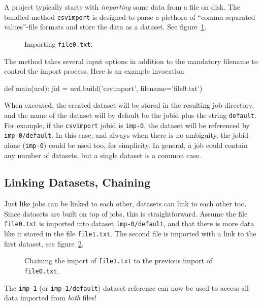 A project typically starts with \textsl{importing} some data from a
file on disk.  The bundled method \texttt{csvimport} is designed to
parse a plethora of ``comma separated values''-file formats and store
the data as a dataset.  See figure~\ref{fig:dataset_csvimport}.
\begin{figure}[b]
  \begin{center}
    
    \caption{Importing \texttt{file0.txt}.}
    \label{fig:dataset_csvimport}
  \end{center}
\end{figure}
The method takes several input options in addition to the mandatory
filename to control the import process.  Here is an example
invocation
\begin{python}
def main(urd):
    jid = urd.build('csvimport', filename='file0.txt')
\end{python}
When executed, the created dataset will be stored in the resulting job
directory, and the name of the dataset will by default be the jobid
plus the string \texttt{default}.  For example, if the
\texttt{csvimport} jobid is \texttt{imp-0}, the dataset will be
referenced by \texttt{imp-0/default}.  In this case, and always when
there is no ambiguity, the jobid alone (\texttt{imp-0}) could be used
too, for simplicity.  In general, a job could contain any number of
datasets, but a single dataset is a common case.




\subsection{Linking Datasets, Chaining}

Just like jobs can be linked to each other, datasets can link to each
other too.  Since datasets are built on top of jobs, this is
straightforward.  Assume the file \texttt{file0.txt} is imported into
dataset \texttt{imp-0/default}, and that there is more data like it
stored in the file \texttt{file1.txt}.  The second file is imported
with a link to the first dataset, see
figure~\ref{fig:dataset_csvimport_chain}.
\begin{figure}[t]
  \begin{center}
    
    \caption{Chaining the import of \texttt{file1.txt} to the previous
      import of \texttt{file0.txt}.}
    \label{fig:dataset_csvimport_chain}
  \end{center}
\end{figure}
The \texttt{imp-1} (or \texttt{imp-1/default}) dataset reference can
now be used to access all data imported from \textsl{both} files!

